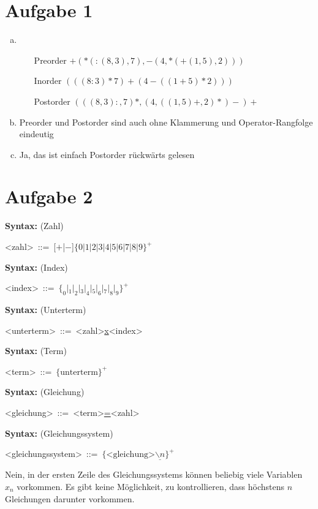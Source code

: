 \documentclass{article}
\newcommand{\syntax}[3]{\textbf{Syntax:} (#1)\begin{center}#2\ ::=\ #3\end{center}}
\begin{document}
\section*{Aufgabe 1}
\begin{enumerate}[(a)]
    \item 
    \hspace*{2cm}\begin{itemize}
        \item[Preorder] $+(*(:(8,3),7),-(4,*(+(1,5),2)))$
        \item[Inorder] $(((8:3)*7)+(4-((1+5)*2)))$    
        \item[Postorder] $(((8,3):, 7)*, (4, ((1, 5)+, 2)*)-)+$
    \end{itemize}
    \item Preorder und Postorder sind auch ohne Klammerung und Operator-Rangfolge eindeutig
    \item Ja, das ist einfach Postorder rückwärts gelesen
\end{enumerate}
\section*{Aufgabe 2}
\syntax{Zahl}{<zahl>}{[$+$|$-$]$\{0|1|2|3|4|5|6|7|8|9\}^{+}$}
\syntax{Index}{<index>}{$\{_0|_1|_2|_3|_4|_5|_6|_7|_8|_9\}^+$}
\syntax{Unterterm}{<unterterm>}{<zahl>\underline{x}<index>}
\syntax{Term}{<term>}{$\{\text{unterterm}\}^+$}
\syntax{Gleichung}{<gleichung>}{<term>\underline{=}<zahl>}
\syntax{Gleichungssystem}{<gleichungssystem>}{$\{\text{<gleichung>}\underline{\backslash n}\}^+$}
Nein, in der ersten Zeile des Gleichungssystems können beliebig viele Variablen $x_n$ vorkommen. Es gibt keine Möglichkeit, zu kontrollieren, dass höchstens $n$ Gleichungen darunter vorkommen.
\end{document}
